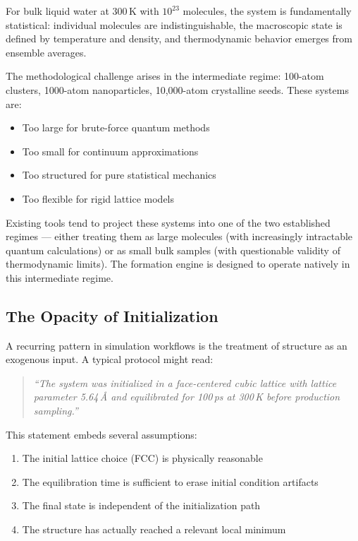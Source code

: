\documentclass[11pt]{article}
\begin{document}
For bulk liquid water at 300\,K with $10^{23}$ molecules, the system is fundamentally statistical: individual molecules are indistinguishable, the macroscopic state is defined by temperature and density, and thermodynamic behavior emerges from ensemble averages.

The methodological challenge arises in the intermediate regime: 100-atom clusters, 1000-atom nanoparticles, 10,000-atom crystalline seeds. These systems are:

\begin{itemize}
\item Too large for brute-force quantum methods
\item Too small for continuum approximations
\item Too structured for pure statistical mechanics
\item Too flexible for rigid lattice models
\end{itemize}

Existing tools tend to project these systems into one of the two established regimes — either treating them as large molecules (with increasingly intractable quantum calculations) or as small bulk samples (with questionable validity of thermodynamic limits). The formation engine is designed to operate natively in this intermediate regime.

\subsection{The Opacity of Initialization}

A recurring pattern in simulation workflows is the treatment of structure as an exogenous input. A typical protocol might read:

\begin{quote}
\textit{``The system was initialized in a face-centered cubic lattice with lattice parameter 5.64\,Å and equilibrated for 100\,ps at 300\,K before production sampling.''}
\end{quote}

This statement embeds several assumptions:

\begin{enumerate}
\item The initial lattice choice (FCC) is physically reasonable
\item The equilibration time is sufficient to erase initial condition artifacts
\item The final state is independent of the initialization path
\item The structure has actually reached a relevant local minimum
\end{enumerate}
\end{document}
